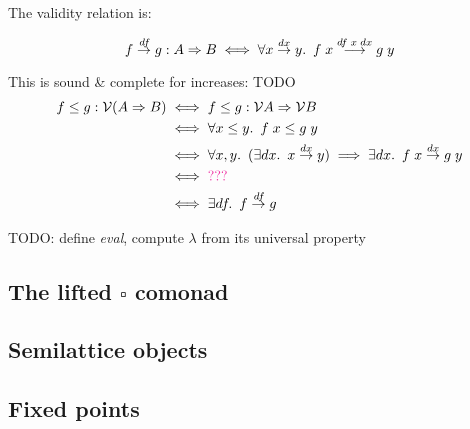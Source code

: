 \documentclass[nomarginums]{rntz}
\newcommand\todo[1]{{\color{Rhodamine}#1}}
\newcommand\iso{\texorpdfstring{\ensuremath{\square}}{iso}}
\newcommand\fname[1]{\textit{#1}}
\newcommand\validarrow{{\to}}
\newcommand\longvalidarrow{{\longrightarrow}}
\newcommand\valid[1]{\mathrel{\overset{#1}{\validarrow}}}
\newcommand\longvalid[1]{\mathrel{\overset{#1}{\longvalidarrow}}}
\newcommand\vals[1]{#1^v} %
\renewcommand\vals{\mathcal{V}}
\newcommand\bindsp{~\,}
\newcommand\fa[1]{\forall #1.\bindsp}
\newcommand\ex[1]{\exists #1.\bindsp}
\begin{document}
\noindent
The validity relation is:

\begin{equation*}
  f \valid{\df} g : \expO A B
  \iff \fa{x \valid{dx} y} f\;x \longvalid{df \;x \;dx} g\;y
\end{equation*}

\noindent
This is sound \& complete for increases: \todo{TODO}
\begin{align*}
  f \le g : \vals{(\expO A B)}
  &\iff f \le g : \expO{\vals A}{\vals B}\\
  &\iff \fa{x \le y} f\;x \le g\;y\\
  &\iff \fa{x,y} (\ex{dx} x \valid{dx} y)
  \implies \ex{dx} f\;x \valid{dx} g\;y\\
  &\iff \todo{???}\\
  &\iff \ex{\df} f \valid{\df} g
\end{align*}

\newcommand\fn\lambda
\todo{TODO: define \fname{eval}, compute $\fn$ from its universal property}


\subsection{The lifted \iso{} comonad}

\subsection{Semilattice objects}

\subsection{Fixed points}
\end{document}
